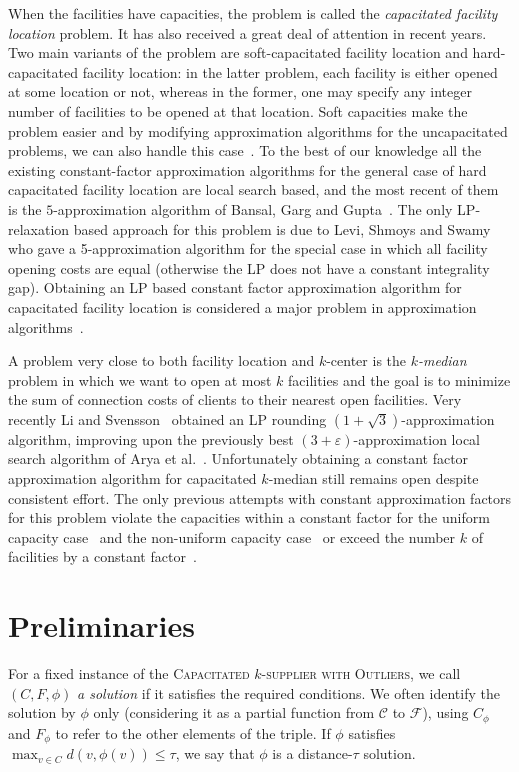 \documentclass{article}
\newcommand{\F}{\mathcal{F}}
\newcommand{\C}{\mathcal{C}}
\newcommand{\fullsup}{\textsc{Capacitated} $k$-\textsc{supplier with Outliers}}
\theoremstyle{plain}
\theoremstyle{definition}
\begin{document}
When the facilities have capacities, the problem is called the {\em capacitated
facility location} problem. It has also received a great deal of
attention in recent years. Two main variants of the problem are
soft-capacitated facility location and hard-capacitated facility
location: in the latter problem, each facility is either opened at
some location or not, whereas in the former, one may specify any
integer number of facilities to be opened at that location. Soft
capacities make the problem easier and by modifying approximation
algorithms for the uncapacitated problems, we can also handle this
case~\cite{STA,JV}.
To the best of our knowledge all the existing constant-factor approximation
algorithms for the general case of hard capacitated facility location
are local search based, and the most recent of them is the $5$-approximation
algorithm of Bansal, Garg and Gupta~\cite{bgg12}.
The only LP-relaxation based approach for this problem is due to Levi, Shmoys
and Swamy~\cite{LSS04} who gave a 5-approximation algorithm for the
special case in which all facility opening costs are equal
(otherwise the LP does not have a constant integrality gap).
Obtaining an LP based constant factor approximation algorithm
for capacitated facility location is considered a major problem in
approximation algorithms~\cite{sw-book}.

A problem very close to both facility location and $k$-center is the {\em $k$-median} problem in which we want to open at most $k$ facilities 
and the goal is to minimize the sum of connection costs of clients to their nearest open facilities.
Very recently Li and Svensson~\cite{li-svensson} obtained an LP rounding $(1+\sqrt{3})$-approximation algorithm,
improving upon the previously best $(3+\varepsilon)$-approximation local search
algorithm of Arya et al.~\cite{kmed3}.
Unfortunately obtaining a constant factor approximation algorithm for capacitated $k$-median still remains open despite consistent effort. 
The only previous attempts with  constant approximation factors for this problem violate the capacities within a constant 
factor for the uniform capacity case~\cite{CGTS} and the non-uniform capacity case~\cite{CR05} or exceed the number $k$ of facilities by a constant factor~\cite{BCR01}. 

\section{Preliminaries}

For a fixed instance of the \fullsup, we call $(C,F,\phi)$
\emph{a solution} if it satisfies the required conditions. We often identify the
solution by $\phi$ only (considering it as a partial function from $\C$ to $\F$),
using $C_\phi$ and $F_\phi$ to refer to the other elements of the triple.
If $\phi$ satisfies $\max_{v\in C} d(v, \phi(v))\le \tau$, we say that $\phi$ is
a distance-$\tau$ solution.
\end{document}
